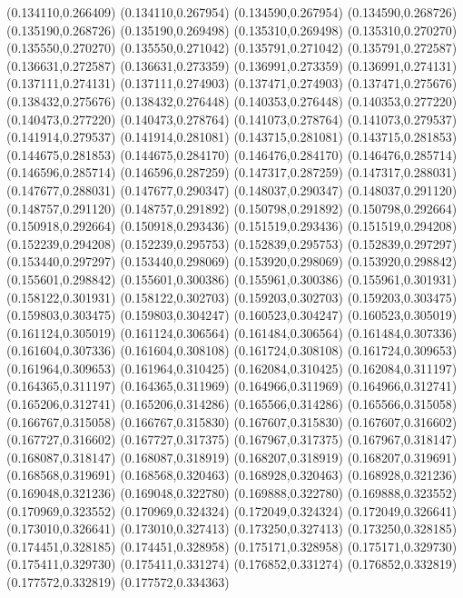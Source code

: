 (0.134110,0.266409)
(0.134110,0.267954)
(0.134590,0.267954)
(0.134590,0.268726)
(0.135190,0.268726)
(0.135190,0.269498)
(0.135310,0.269498)
(0.135310,0.270270)
(0.135550,0.270270)
(0.135550,0.271042)
(0.135791,0.271042)
(0.135791,0.272587)
(0.136631,0.272587)
(0.136631,0.273359)
(0.136991,0.273359)
(0.136991,0.274131)
(0.137111,0.274131)
(0.137111,0.274903)
(0.137471,0.274903)
(0.137471,0.275676)
(0.138432,0.275676)
(0.138432,0.276448)
(0.140353,0.276448)
(0.140353,0.277220)
(0.140473,0.277220)
(0.140473,0.278764)
(0.141073,0.278764)
(0.141073,0.279537)
(0.141914,0.279537)
(0.141914,0.281081)
(0.143715,0.281081)
(0.143715,0.281853)
(0.144675,0.281853)
(0.144675,0.284170)
(0.146476,0.284170)
(0.146476,0.285714)
(0.146596,0.285714)
(0.146596,0.287259)
(0.147317,0.287259)
(0.147317,0.288031)
(0.147677,0.288031)
(0.147677,0.290347)
(0.148037,0.290347)
(0.148037,0.291120)
(0.148757,0.291120)
(0.148757,0.291892)
(0.150798,0.291892)
(0.150798,0.292664)
(0.150918,0.292664)
(0.150918,0.293436)
(0.151519,0.293436)
(0.151519,0.294208)
(0.152239,0.294208)
(0.152239,0.295753)
(0.152839,0.295753)
(0.152839,0.297297)
(0.153440,0.297297)
(0.153440,0.298069)
(0.153920,0.298069)
(0.153920,0.298842)
(0.155601,0.298842)
(0.155601,0.300386)
(0.155961,0.300386)
(0.155961,0.301931)
(0.158122,0.301931)
(0.158122,0.302703)
(0.159203,0.302703)
(0.159203,0.303475)
(0.159803,0.303475)
(0.159803,0.304247)
(0.160523,0.304247)
(0.160523,0.305019)
(0.161124,0.305019)
(0.161124,0.306564)
(0.161484,0.306564)
(0.161484,0.307336)
(0.161604,0.307336)
(0.161604,0.308108)
(0.161724,0.308108)
(0.161724,0.309653)
(0.161964,0.309653)
(0.161964,0.310425)
(0.162084,0.310425)
(0.162084,0.311197)
(0.164365,0.311197)
(0.164365,0.311969)
(0.164966,0.311969)
(0.164966,0.312741)
(0.165206,0.312741)
(0.165206,0.314286)
(0.165566,0.314286)
(0.165566,0.315058)
(0.166767,0.315058)
(0.166767,0.315830)
(0.167607,0.315830)
(0.167607,0.316602)
(0.167727,0.316602)
(0.167727,0.317375)
(0.167967,0.317375)
(0.167967,0.318147)
(0.168087,0.318147)
(0.168087,0.318919)
(0.168207,0.318919)
(0.168207,0.319691)
(0.168568,0.319691)
(0.168568,0.320463)
(0.168928,0.320463)
(0.168928,0.321236)
(0.169048,0.321236)
(0.169048,0.322780)
(0.169888,0.322780)
(0.169888,0.323552)
(0.170969,0.323552)
(0.170969,0.324324)
(0.172049,0.324324)
(0.172049,0.326641)
(0.173010,0.326641)
(0.173010,0.327413)
(0.173250,0.327413)
(0.173250,0.328185)
(0.174451,0.328185)
(0.174451,0.328958)
(0.175171,0.328958)
(0.175171,0.329730)
(0.175411,0.329730)
(0.175411,0.331274)
(0.176852,0.331274)
(0.176852,0.332819)
(0.177572,0.332819)
(0.177572,0.334363)
